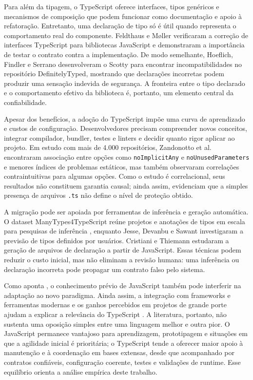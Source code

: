 Para além da tipagem, o TypeScript oferece interfaces, tipos genéricos e mecanismos de composição que podem funcionar como documentação e apoio à refatoração. Entretanto, uma declaração de tipo só é útil quando representa o comportamento real do componente. Feldthaus e Møller \cite{feldthaus2014interfaces} verificaram a correção de interfaces TypeScript para bibliotecas JavaScript e demonstraram a importância de testar o contrato contra a implementação. De modo semelhante, Hoeflich, Findler e Serrano \cite{hoeflich2022scotty} desenvolveram o Scotty para encontrar incompatibilidades no repositório DefinitelyTyped, mostrando que declarações incorretas podem produzir uma sensação indevida de segurança. A fronteira entre o tipo declarado e o comportamento efetivo da biblioteca é, portanto, um elemento central da confiabilidade.

Apesar dos benefícios, a adoção do TypeScript impõe uma curva de aprendizado e custos de configuração. Desenvolvedores precisam compreender novos conceitos, integrar compilador, bundler, testes e linters e decidir quanto rigor aplicar ao projeto. Em estudo com mais de 4.000 repositórios, Zandonotto et al. \cite{zandonotto2026compiler} encontraram associação entre opções como \texttt{noImplicitAny} e \texttt{noUnusedParameters} e menores índices de problemas estáticos, mas também observaram correlações contraintuitivas para algumas opções. Como o estudo é correlacional, seus resultados não constituem garantia causal; ainda assim, evidenciam que a simples presença de arquivos \texttt{.ts} não define o nível de proteção obtido.

A migração pode ser apoiada por ferramentas de inferência e geração automática. O dataset ManyTypes4TypeScript reúne projetos e anotações de tipos em escala para pesquisas de inferência \cite{jesse2022manytypes}, enquanto Jesse, Devanbu e Sawant \cite{jesse2023types} investigaram a previsão de tipos definidos por usuários. Cristiani e Thiemann \cite{cristiani2021declarations} estudaram a geração de arquivos de declaração a partir de JavaScript. Essas técnicas podem reduzir o custo inicial, mas não eliminam a revisão humana: uma inferência ou declaração incorreta pode propagar um contrato falso pelo sistema.

Como aponta \cite{shrestha2022}, o conhecimento prévio de JavaScript também pode interferir na adaptação ao novo paradigma. Ainda assim, a integração com frameworks e ferramentas modernas e os ganhos percebidos em projetos de grande porte ajudam a explicar a relevância do TypeScript \cite{stackoverflow2023}. A literatura, portanto, não sustenta uma oposição simples entre uma linguagem melhor e outra pior. O JavaScript permanece vantajoso para aprendizagem, prototipagem e situações em que a agilidade inicial é prioritária; o TypeScript tende a oferecer maior apoio à manutenção e à coordenação em bases extensas, desde que acompanhado por contratos confiáveis, configuração coerente, testes e validações de runtime. Esse equilíbrio orienta a análise empírica deste trabalho.

